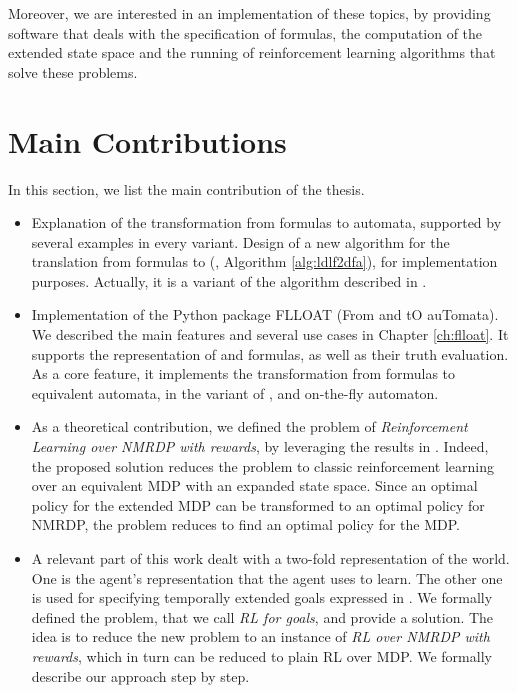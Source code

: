 Moreover, we are interested in an implementation of these topics, by providing software that deals with the specification of \LLf formulas, the computation of the extended state space and the running of reinforcement learning algorithms that solve these problems.

\section{Main Contributions}
In this section, we list the main contribution of the thesis.
\begin{itemize}
	\item Explanation of the transformation from \LLf formulas to automata, supported by several examples in every variant. Design of a new algorithm for the translation from \LLf formulas to \DFA (\LDLfToDFA, Algorithm \ref{alg:ldlf2dfa}), for implementation purposes. Actually, it is a variant of the \LDLfToNFA algorithm described in \citep{AAAI1817342}.
	
	\item Implementation of the Python package FLLOAT (From \LTLf and \LDLf tO auTomata). We described the main features and several use cases in Chapter \ref{ch:flloat}. It supports the representation of \PL and \LLf formulas, as well as their truth evaluation. As a core feature, it implements the transformation from \LLf formulas to equivalent automata, in the variant of \LDLfToNFA, \LDLfToDFA and on-the-fly automaton.
	
	\item As a theoretical contribution, we defined the problem of \emph{Reinforcement Learning over NMRDP with \LLf rewards}, by leveraging the results in \citep{AAAI1817342}. Indeed, the proposed solution reduces the problem to classic reinforcement learning over an equivalent MDP with an expanded state space. Since an optimal policy for the extended MDP can be transformed to an optimal policy for NMRDP, the problem reduces to find an optimal policy for the MDP.
	
	\item A relevant part of this work dealt with a two-fold representation of the world. One is the agent's representation that the agent uses to learn. The other one is used for specifying temporally extended goals expressed in \LLf. We formally defined the problem, that we call \emph{RL for \LLf goals}, and provide a solution. The idea is to reduce the new problem to an instance of \emph{RL over NMRDP with \LLf rewards}, which in turn can be reduced to plain RL over MDP. We formally describe our approach step by step.
	

\end{itemize}

